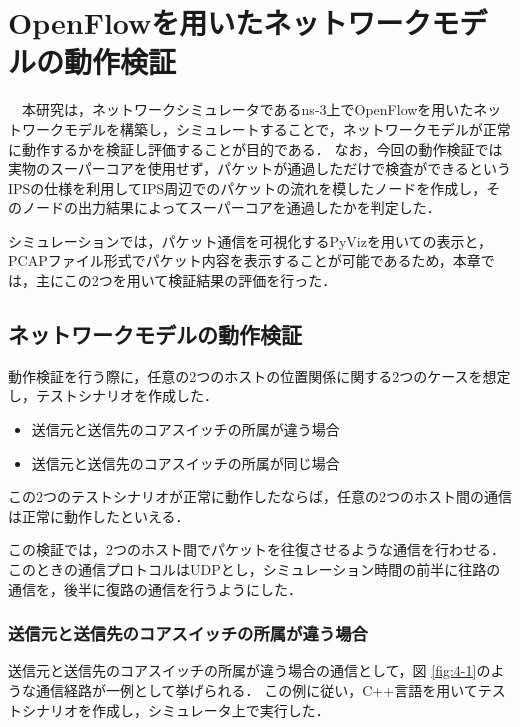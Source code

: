 \chapter{OpenFlowを用いたネットワークモデルの動作検証}

　本研究は，ネットワークシミュレータであるns-3上でOpenFlowを用いたネットワークモデルを構築し，シミュレートすることで，ネットワークモデルが正常に動作するかを検証し評価することが目的である．
なお，今回の動作検証では実物のスーパーコアを使用せず，パケットが通過しただけで検査ができるというIPSの仕様を利用してIPS周辺でのパケットの流れを模したノードを作成し，そのノードの出力結果によってスーパーコアを通過したかを判定した．

シミュレーションでは，パケット通信を可視化するPyVizを用いての表示と，PCAPファイル形式でパケット内容を表示することが可能であるため，本章では，主にこの2つを用いて検証結果の評価を行った．

\section{ネットワークモデルの動作検証}

動作検証を行う際に，任意の2つのホストの位置関係に関する2つのケースを想定し，テストシナリオを作成した．

\begin{itemize}
	\item 送信元と送信先のコアスイッチの所属が違う場合
	\item 送信元と送信先のコアスイッチの所属が同じ場合
\end{itemize}

この2つのテストシナリオが正常に動作したならば，任意の2つのホスト間の通信は正常に動作したといえる．

この検証では，2つのホスト間でパケットを往復させるような通信を行わせる．
このときの通信プロトコルはUDPとし，シミュレーション時間の前半に往路の通信を，後半に復路の通信を行うようにした．

\subsection{送信元と送信先のコアスイッチの所属が違う場合}

送信元と送信先のコアスイッチの所属が違う場合の通信として，図 \ref{fig:4-1}のような通信経路が一例として挙げられる．
この例に従い，C++言語を用いてテストシナリオを作成し，シミュレータ上で実行した．

